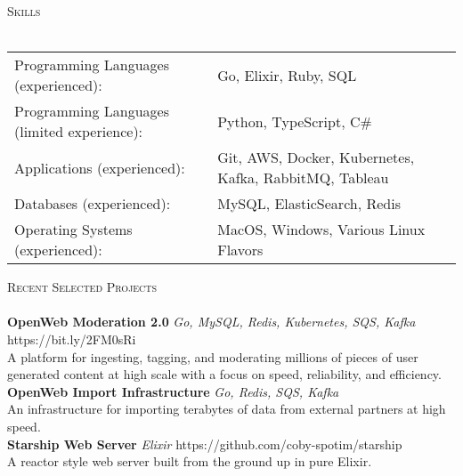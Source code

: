 \documentclass[a4paper]{article}
\newcommand{\lineunder} {
    \vspace*{-8pt} \\
    \hspace*{-18pt} \hrulefill \\
}
\newcommand{\header} [1] {
    {\hspace*{-18pt}\vspace*{6pt} \textsc{#1}}
    \vspace*{-6pt} \lineunder
}
\begin{document}
\header{Skills}
\begin{tabular}{ l l }
	Programming Languages (experienced):        & Go, Elixir, Ruby, SQL                                  \\
	Programming Languages (limited experience): & Python, TypeScript, C\#                                \\
	Applications (experienced):                 & Git, AWS, Docker, Kubernetes, Kafka, RabbitMQ, Tableau \\
	Databases (experienced):                    & MySQL, ElasticSearch, Redis                            \\
	Operating Systems (experienced):            & MacOS, Windows, Various Linux Flavors                  \\
\end{tabular}
\vspace{2mm}

\header{Recent Selected Projects}
{\textbf{OpenWeb Moderation 2.0}} {\sl Go, MySQL, Redis, Kubernetes, SQS, Kafka} \hfill https://bit.ly/2FM0sRi\\
A platform for ingesting, tagging, and moderating millions of pieces of user generated content at high scale with a focus on speed, reliability, and efficiency.\\
\vspace*{2mm}
{\textbf{OpenWeb Import Infrastructure}} {\sl Go, Redis, SQS, Kafka} \\
An infrastructure for importing terabytes of data from external partners at high speed.\\
\vspace*{2mm}
{\textbf{Starship Web Server}} {\sl Elixir} \hfill https://github.com/coby-spotim/starship\\
A reactor style web server built from the ground up in pure Elixir.\\
\vspace*{2mm}



\ 
\end{document}
